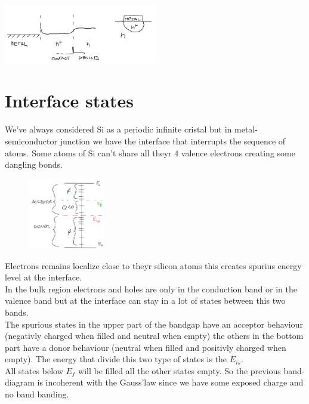 \centering
\includegraphics[width=0.5\textwidth]{ohmicconctact.png}\\
\raggedright

\section{Interface states}
We've always considered Si as a periodic infinite cristal but in metal-semiconductor junction we have the interface that interrupts the sequence of atoms. Some atoms of Si can't share all theyr 4 valence electrons creating some dangling bonds.\\

\begin{figure}
\includegraphics[width=0.3\textwidth]{is01.png}
\end{figure}

Electrons remains localize close to theyr silicon atoms this creates spurius energy level at the interface.\\ 
In the bulk region electrons and holes are only in the conduction band or in the valence band but at the interface can stay in a lot of states between this two bands.\\
The spurious states in the upper part of the bandgap have an acceptor behaviour (negativly charged when filled and neutral when empty) the others in the bottom part have a donor behaviour (neutral when filled and positivly charged when empty). The energy that divide this two type of states is the $E_{is}$.\\
All states below $E_f$ will be filled all the other states empty. So the previous band-diagram is incoherent with the Gauss'law since we have some exposed charge and no band banding.\\ 

